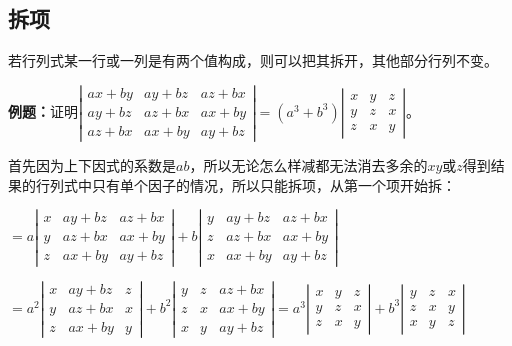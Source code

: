 \documentclass[UTF8, 12pt]{ctexart}
\begin{document}


\subsection{拆项}

若行列式某一行或一列是有两个值构成，则可以把其拆开，其他部分行列不变。

\textbf{例题：}证明$\left|\begin{array}{ccc}
    ax+by & ay+bz & az+bx \\
    ay+bz & az+bx & ax+by \\
    az+bx & ax+by & ay+bz
\end{array}\right|=(a^3+b^3)\left|\begin{array}{ccc}
    x & y & z \\
    y & z & x \\
    z & x & y
\end{array}\right|$。

首先因为上下因式的系数是$ab$，所以无论怎么样减都无法消去多余的$xy$或$z$得到结果的行列式中只有单个因子的情况，所以只能拆项，从第一个项开始拆：

$=a\left|\begin{array}{ccc}
    x & ay+bz & az+bx \\
    y & az+bx & ax+by \\
    z & ax+by & ay+bz
\end{array}\right|+b\left|\begin{array}{ccc}
    y & ay+bz & az+bx \\
    z & az+bx & ax+by \\
    x & ax+by & ay+bz
\end{array}\right|$

$=a^2\left|\begin{array}{ccc}
    x & ay+bz & z \\
    y & az+bx & x \\
    z & ax+by & y
\end{array}\right|+b^2\left|\begin{array}{ccc}
    y & z & az+bx \\
    z & x & ax+by \\
    x & y & ay+bz
\end{array}\right|=a^3\left|\begin{array}{ccc}
    x & y & z \\
    y & z & x \\
    z & x & y
\end{array}\right|+b^3\left|\begin{array}{ccc}
    y & z & x \\
    z & x & y \\
    x & y & z
\end{array}\right|$
\end{document}
